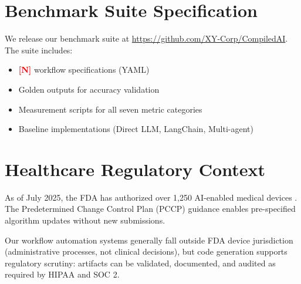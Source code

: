 \documentclass[11pt]{article}
\newcommand{\placeholder}[1]{\textcolor{red}{\textbf{[#1]}}}
\begin{document}
\section{Benchmark Suite Specification}
\label{app:benchmark}

We release our benchmark suite at \url{https://github.com/XY-Corp/CompiledAI}. The suite includes:

\begin{itemize}
    \item \placeholder{N} workflow specifications (YAML)
    \item Golden outputs for accuracy validation
    \item Measurement scripts for all seven metric categories
    \item Baseline implementations (Direct LLM, LangChain, Multi-agent)
\end{itemize}

\section{Healthcare Regulatory Context}
\label{app:regulatory}

As of July 2025, the FDA has authorized over 1,250 AI-enabled medical devices \citep{fda2025}. The Predetermined Change Control Plan (PCCP) guidance enables pre-specified algorithm updates without new submissions.

Our workflow automation systems generally fall outside FDA device jurisdiction (administrative processes, not clinical decisions), but code generation supports regulatory scrutiny: artifacts can be validated, documented, and audited as required by HIPAA and SOC 2.
\end{document}
